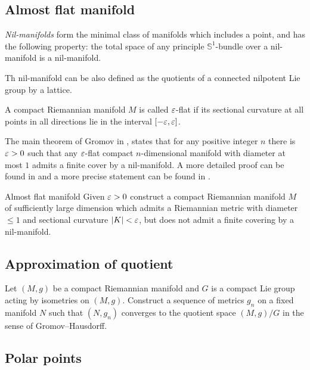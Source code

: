 \subsection*{Almost flat manifold}

\emph{Nil-manifolds} form the minimal class of manifolds which includes a point, and has the following property:  
the total space of any principle $\mathbb{S}^1$-bundle over a nil-manifold is a nil-manifold. 

Th nil-manifold can be also defined as the quotients of a connected nilpotent Lie group by a lattice.

A compact Riemannian manifold $M$ is called $\varepsilon$-flat if its sectional curvature at all points in all directions lie in the interval $[-\varepsilon,\varepsilon]$. 

The main theorem of Gromov in \cite{gromov-almost-flat}, 
states that for any positive integer $n$ there is $\varepsilon>0$ such that any $\varepsilon$-flat compact $n$-dimensional manifold with diameter at most $1$ admits a finite cover by a nil-manifold.
A more detailed proof can be found in \cite{buser-karcher}
and a more precise statement can be found in \cite{ruh}.

\begin{pr}{}{Almost flat manifold}\label{almost-flat}
Given $\varepsilon>0$ construct a compact Riemannian manifold $M$ of sufficiently large dimension which admits a Riemannian metric with diameter $\le 1$ and sectional
curvature $|K|<\varepsilon$,
but does not admit a finite covering by a nil-manifold.
\end{pr}

\subsection*{Approximation of quotient}

\begin{pr}{}{}
Let $(M,g)$ be a compact Riemannian manifold 
and $G$ is a compact Lie group acting by isometries on $(M,g)$.
Construct a sequence of metrics $g_n$ on a fixed manifold $N$ such that $(N,g_n)$ converges to the quotient space $(M,g)/G$ in the sense of Gromov--Hausdorff.
\end{pr}


\subsection*{Polar points\many}


